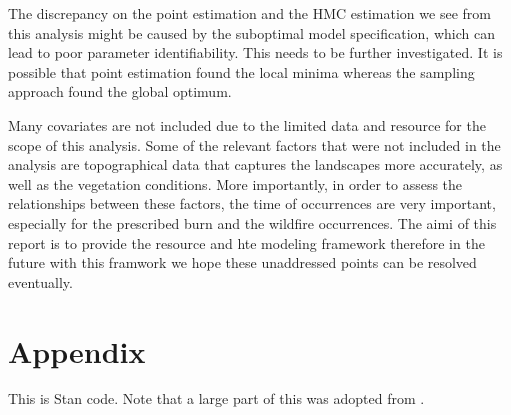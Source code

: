 \documentclass{article}
\begin{document}
The discrepancy on the point estimation and the HMC estimation we see from this analysis might be caused by the suboptimal model specification, which can lead to poor parameter identifiability. This needs to be further investigated. It is possible that point estimation found the local minima whereas the sampling approach found the global optimum. 

Many covariates are not included due to the limited data and resource for the scope of this analysis. Some of the relevant factors that were not included in the analysis are topographical data that captures the landscapes more accurately, as well as the vegetation conditions. More importantly, in order to assess the relationships between these factors, the time of occurrences are very important, especially for the prescribed burn and the wildfire occurrences. The aimi of this report is to provide the resource and hte modeling framework therefore in the future with this framwork we hope these unaddressed points can be resolved eventually. 


\clearpage

















\clearpage
\section{Appendix}
\makeatother
This is Stan code. Note that a large part of this was adopted from \cite{riutort2020practical}. 
\end{document}
